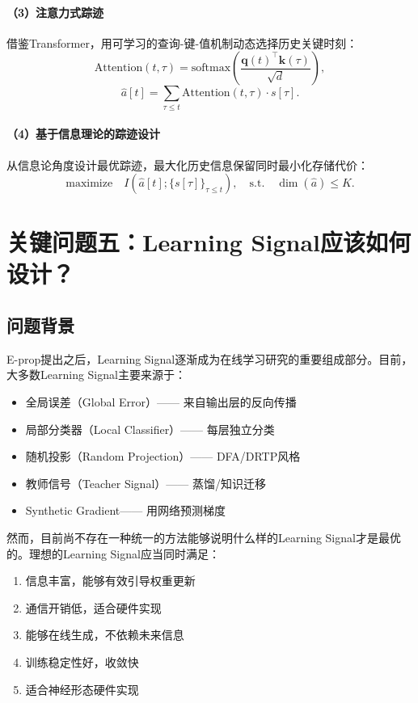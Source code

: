 \documentclass[journal,12pt,onecolumn]{IEEEtran}
\begin{document}
\paragraph{（3）注意力式踪迹}
借鉴Transformer，用可学习的查询-键-值机制动态选择历史关键时刻：
\[
\text{Attention}(t, \tau) = \text{softmax}\left( \frac{\mathbf{q}(t)^\top \mathbf{k}(\tau)}{\sqrt{d}} \right),
\]
\[
\hat{a}[t] = \sum_{\tau \le t} \text{Attention}(t, \tau) \cdot s[\tau].
\]

\paragraph{（4）基于信息理论的踪迹设计}
从信息论角度设计最优踪迹，最大化历史信息保留同时最小化存储代价：
\[
\text{maximize} \quad I(\hat{a}[t]; \{s[\tau]\}_{\tau \le t}), \quad \text{s.t.} \quad \dim(\hat{a}) \le K.
\]

\section{关键问题五：Learning Signal应该如何设计？}

\subsection{问题背景}

E-prop提出之后，Learning Signal逐渐成为在线学习研究的重要组成部分。目前，大多数Learning Signal主要来源于：

\begin{itemize}
    \item 全局误差（Global Error）—— 来自输出层的反向传播
    \item 局部分类器（Local Classifier）—— 每层独立分类
    \item 随机投影（Random Projection）—— DFA/DRTP风格
    \item 教师信号（Teacher Signal）—— 蒸馏/知识迁移
    \item Synthetic Gradient—— 用网络预测梯度
\end{itemize}

然而，目前尚不存在一种统一的方法能够说明什么样的Learning Signal才是最优的。理想的Learning Signal应当同时满足：
\begin{enumerate}
    \item 信息丰富，能够有效引导权重更新
    \item 通信开销低，适合硬件实现
    \item 能够在线生成，不依赖未来信息
    \item 训练稳定性好，收敛快
    \item 适合神经形态硬件实现
\end{enumerate}
\end{document}
